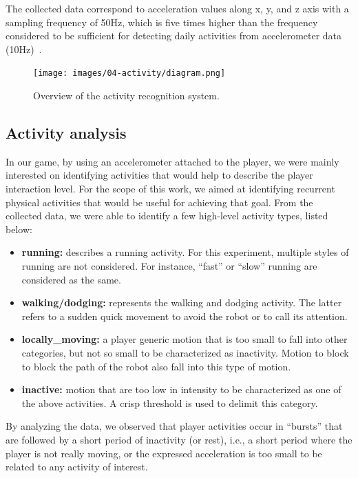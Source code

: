The collected data correspond to acceleration values along x, y, and z axis with a sampling frequency of 50Hz, which is five times higher than the frequency considered to be sufficient for detecting daily activities from accelerometer data (10Hz)~\citep{atallah_sensor_2010, ravi_activity_2005, kikhia_analyzing_2014}.

\begin{figure}[!t]
\normalsize
      \centering
      {\texttt{[image: images/04-activity/diagram.png]}}
      \caption{Overview of the activity recognition system.}
      \label{approach}
\end{figure}
  
\subsection{Activity analysis}\label{sec:activity_analysis}

In our game, by using an accelerometer attached to the player, we were mainly interested on identifying activities that would help to describe the player interaction level. For the scope of this work, we aimed at identifying recurrent physical activities that would be useful for achieving that goal. From the collected data, we were able to identify a few high-level activity types, listed below:

\begin{itemize}
\item  \textbf{running:} describes a running activity. For this experiment, multiple styles of running are not considered. For instance, ``fast'' or ``slow'' running are considered as the same.
\item \textbf{walking/dodging:} represents the walking and dodging activity. The latter refers to a sudden quick movement to avoid the robot or to call its attention.
\item  \textbf{locally\_moving:} a player generic motion that is too small to fall into other categories, but not so small to be characterized as inactivity. Motion to block to block the path of the robot also fall into this type of motion.
\item  \textbf{inactive:} motion that are too low in intensity to be characterized as one of the above activities. A crisp threshold is used to delimit this category. 
\end{itemize}

By analyzing the data, we observed that player activities occur in ``bursts'' that are followed by a short period of inactivity (or rest), i.e., a short period where the player is not really moving, or the expressed acceleration is too small to be related to any activity of interest.

